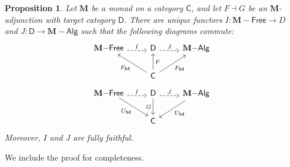 \documentclass{article}
\newtheorem{prop}{Proposition}
\theoremstyle{definition}
\newcommand{\C}{\mathsf{C}}
\newcommand{\D}{\mathsf{D}}
\newcommand{\M}{\mathbf{M}}
\newcommand{\Alg}{\mathsf{Alg}}
\newcommand{\Free}{\mathsf{Free}}
\begin{document}
\begin{prop}\label{prop:comparison}
Let $\M$ be a monad on a category $\C$, and let $F \dashv G$ be an $\M$-adjunction with target category $\D$. There are unique functors $I : \M{-}\Free \to D$ and $J : \D \to \M{-}\Alg$ such that the following diagrams commute:
\[\begin{tikzcd}[ampersand replacement=\&]
    {\M{-}\Free} \& \D \& {\M{-}\Alg} \\
    \& \C
    \arrow["{F_{\M}}", from=2-2, to=1-1]
    \arrow["F"', from=2-2, to=1-2]
    \arrow["{F_{\M}}"', from=2-2, to=1-3]
    \arrow["I", shift right=1, dashed, from=1-1, to=1-2]
    \arrow["J", shift right=1, dashed, from=1-2, to=1-3]
\end{tikzcd}\]
\[\begin{tikzcd}[ampersand replacement=\&]
    {\M{-}\Free} \& \D \& {\M{-}\Alg} \\
    \& \C
    \arrow["I", shift right=1, dashed, from=1-1, to=1-2]
    \arrow["J", shift right=1, dashed, from=1-2, to=1-3]
    \arrow["{U_{\M}}"', shift left=1, from=1-1, to=2-2]
    \arrow["G"', from=1-2, to=2-2]
    \arrow["{U_{\M}}", from=1-3, to=2-2]
\end{tikzcd}\]
Moreover, $I$ and $J$ are fully faithful.
\end{prop}
We include the proof for completeness.
\end{document}
